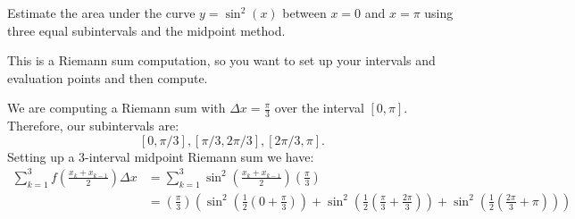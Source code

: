 \documentclass{ximera}
\author{Emma Smith Zbarsky}
\begin{document}
\begin{exercise}

Estimate the area under the curve $y=\sin^2(x)$ between $x=0$ and
$x=\pi$ using three equal subintervals and the midpoint method.


\begin{hint}
This is a Riemann sum computation, so you want to set up your intervals
and evaluation points and then compute.
\end{hint}


\begin{hint}
We are computing a Riemann sum with $\Delta x = \frac{\pi}{3}$ over the
interval $[0,\pi]$. Therefore, our subintervals are:
\[[0,\pi/3], [\pi/3,2\pi/3], [2\pi/3,\pi].\] Setting up a 3-interval
midpoint Riemann sum we have: \begin{align*}
\sum_{k=1}^3 f\left(\frac{x_k+x_{k-1}}{2}\right) \Delta x &= \sum_{k=1}^3 \sin^2\left(\frac{x_k+x_{k-1}}{2}\right) \left(\frac{\pi}{3}\right) \\
&= \left(\frac{\pi}{3}\right)\left(\sin^2\left(\frac{1}{2}\left(0+\frac{\pi}{3}\right)\right)+\sin^2\left(\frac{1}{2}\left(\frac{\pi}{3}+\frac{2\pi}{3}\right)\right) + \sin^2\left(\frac{1}{2}\left(\frac{2\pi}{3}+\pi\right)\right)\right)
\end{align*}
\end{hint}


\begin{multipleChoice}
\end{multipleChoice}

\end{exercise}
\end{document}
